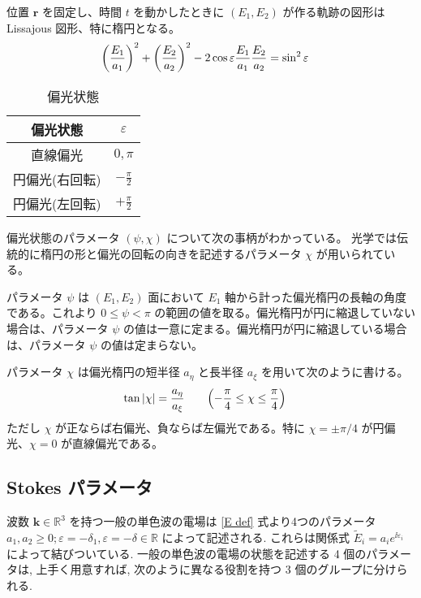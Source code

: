 \documentclass[uplatex,dvipdfmx,a4paper,11pt]{jlreq}
\newcommand{\RR}{\mathbb{R}}
\newcommand{\rr}{\bm{r}}
\newcommand{\kk}{\bm{k}}
\theoremstyle{definition}
\begin{document}
\begin{proposition}
  位置 $\rr$ を固定し、時間 $t$ を動かしたときに $(E_1, E_2)$ が作る軌跡の図形は Lissajous 図形、特に楕円となる。
  \begin{align}
    \qty(\frac{E_1}{a_1})^2 + \qty(\frac{E_2}{a_2})^2 - 2\cos\varepsilon\frac{E_1}{a_1}\frac{E_2}{a_2} & = \sin^2{\varepsilon}
  \end{align}
\end{proposition}

\begin{table}[hbtp]
  \centering
  \begin{tabular}{|c|c|}
    \hline
    偏光状態     & $\varepsilon$    \\
    \hline \hline
    直線偏光     & $0, \pi$         \\
    円偏光(右回転) & $-\frac{\pi}{2}$ \\
    円偏光(左回転) & $+\frac{\pi}{2}$ \\
    \hline
  \end{tabular}
  \caption{偏光状態}
\end{table}

\begin{definition}
  偏光状態のパラメータ $(\psi, \chi)$ について次の事柄がわかっている。
  光学では伝統的に楕円の形と偏光の回転の向きを記述するパラメータ $\chi$ が用いられている。

  パラメータ $\psi$ は $(E_1, E_2)$ 面において $E_1$ 軸から計った偏光楕円の長軸の角度である。これより $0 \leq \psi < \pi$ の範囲の値を取る。偏光楕円が円に縮退していない場合は、パラメータ $\psi$ の値は一意に定まる。偏光楕円が円に縮退している場合は、パラメータ $\psi$ の値は定まらない。

  パラメータ $\chi$ は偏光楕円の短半径 $a_\eta$ と長半径 $a_\xi$ を用いて次のように書ける。
  \begin{align}
    \tan|\chi| & = \frac{a_\eta}{a_\xi} \qquad \qty(-\frac{\pi}{4}\leq\chi\leq\frac{\pi}{4})
  \end{align}
  ただし $\chi$ が正ならば右偏光、負ならば左偏光である。特に $\chi = \pm \pi/4$ が円偏光、$\chi = 0$ が直線偏光である。
\end{definition}
\subsection{Stokes パラメータ}
波数 $\kk\in\RR^3$ を持つ一般の単色波の電場は \eqref{E def} 式より4つのパラメータ $a_1, a_2 \geq 0; \varepsilon = -\delta_1, \varepsilon = -\delta\in\RR$ によって記述される. これらは関係式 $\tilde{E}_i = a_ie^{\ii \varepsilon_i}$ によって結びついている. 一般の単色波の電場の状態を記述する 4 個のパラメータは, 上手く用意すれば, 次のように異なる役割を持つ 3 個のグループに分けられる.
\end{document}
